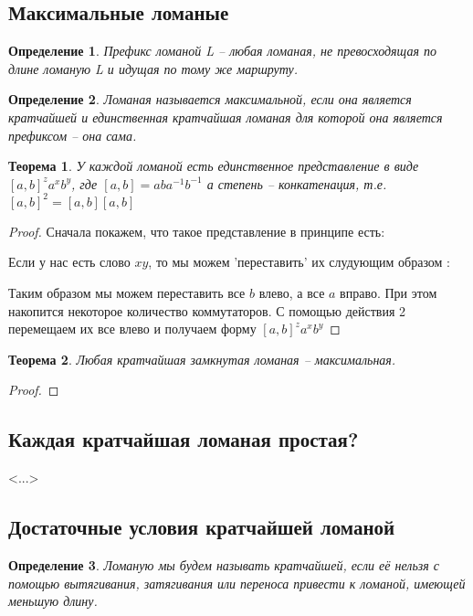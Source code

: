 \documentclass[12pt,a4paper, flushleft]{article}
\newtheorem{Def}{Определение}[section]
\newtheorem{Th}{Теорема}[section]
\begin{document}
\subsection{Максимальные ломаные}

\begin{Def}
	Префикс ломаной L -- любая ломаная, не превосходящая по длине ломаную L и идущая по тому же маршруту. 
\end{Def}

\begin{Def}
	Ломаная называется максимальной, если она является кратчайшей и единственная кратчайшая ломаная для которой она является префиксом -- она сама.
\end{Def}

\begin{Th}
	У каждой ломаной есть единственное представление в виде $[a, b]^za^xb^y$, где $[a, b] = aba^{-1}b^{-1}$  а степень -- конкатенация, т.е. $[a, b]^2 = [a, b][a, b]$
\end{Th}
\begin{proof}
	Сначала покажем, что такое представление в принципе есть:
	
	Если у нас есть слово $xy$, то мы можем 'переставить' их слудующим образом : %
	
	Таким образом мы можем переставить все $b$ влево, а все $a$ вправо. При этом накопится некоторое количество коммутаторов. С помощью действия 2 перемещаем их все влево и получаем форму $[a, b]^za^xb^y$
\end{proof}

\begin{Th}
	Любая кратчайшая замкнутая ломаная -- максимальная.
\end{Th}
\begin{proof}
	
		
\end{proof}

\subsection{Каждая кратчайшая ломаная простая?}
	<...>
\subsection{Достаточные условия кратчайшей ломаной}
\begin{Def}
Ломаную мы будем называть кратчайшей, если её нельзя с помощью вытягивания, затягивания
или переноса привести к ломаной, имеющей меньшую длину.
\end{Def}
\end{document}
